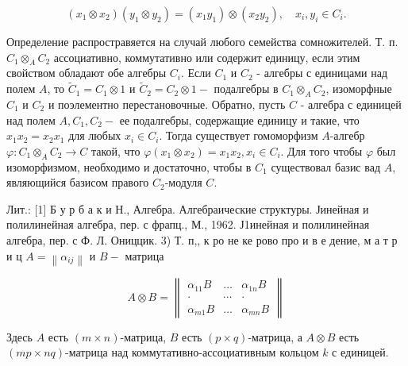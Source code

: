 \documentclass[10pt]{article}
\begin{document}
\[

\left(x_{1} \otimes x_{2}\right)\left(y_{1} \otimes y_{2}\right)=\left(x_{1} y_{1}\right) \otimes\left(x_{2} y_{2}\right), \quad x_{i}, y_{i} \in C_{i} .

\]



Определение распростравяется на случай любого семейства сомножителей. Т. п. $C_{1} \otimes_{A} C_{2}$ ассоциативно, коммутативно или содержит единицу, если этим свойством обладают обе алгебры $C_{i}$. Если $C_{1}$ и $C_{2}$ - алгебры с единицами над полем $A$, то $\tilde{C}_{1}=C_{1} \otimes 1$ и $\tilde{C}_{2}=C_{2} \otimes 1-$ подалгебры в $C_{1} \otimes_{A} C_{2}$, изоморфные $C_{1}$ и $C_{2}$ и поэлементно перестановочные. Обратно, пусть $C$ - алгебра с единицей над полем $A, C_{1}, C_{2}-$ ее подалгебры, содержащие единицу и такие, что $x_{1} x_{2}=x_{2} x_{1}$ для любых $x_{i} \in C_{i}$. Тогда существует гомоморфизм $A$-алгебр $\varphi: C_{1} \otimes_{A} C_{2} \rightarrow C$ такой, что $\varphi\left(x_{1} \otimes x_{2}\right)=x_{1} x_{2}, x_{i} \in C_{i}$. Для того чтобы $\varphi$ был изоморфизмом, необходимо и достаточно, чтобы в $C_{1}$ существовал базис вад $A$, являющийся базисом правого $C_{2}$-модуля $C$.



Лит.: [1] Б у р б а к и Н., Алгебра. Алгебраические структуры. Јинейная и полилинейная алгебра, пер. с фрапц., М., 1962. Ј1инейная и полилинейная алгебра, пер. с Ф. Л. Ониццик. 3) Т. п,, к ро не ке рово про и в е дение, м а т р и ц $A=\left\|\alpha_{i j}\right\|$ и $B-$ матрица



\[

A \otimes B=\left\|\begin{array}{lll}

\alpha_{11} B & \ldots & \alpha_{1 n} B \\

\cdot & \cdots & \cdot \\

\alpha_{m 1} B & \ldots & \alpha_{m n} B

\end{array}\right\|

\]



Здесь $A$ есть $(m \times n)$-матрица, $B$ есть $(p \times q)$-матрица, а $A \otimes B$ есть $(m p \times n q)$-матрица над коммутативно-ассоциативным кольцом $k$ с единицей.
\end{document}
